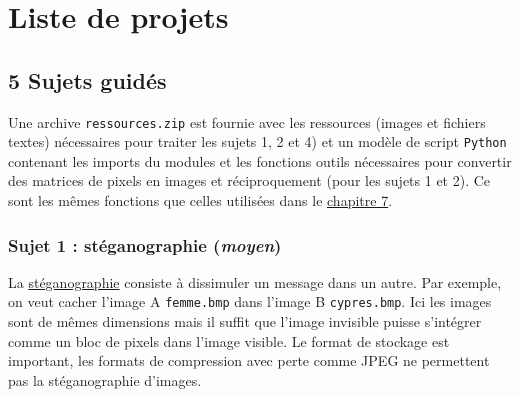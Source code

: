 \documentclass[a4paper, french, 12pt]{article}  %
\begin{document}
 


\section{Liste de projets}


\subsection{5 Sujets  guidés}


Une archive \texttt{ressources.zip} est fournie avec les ressources (images et fichiers textes) nécessaires pour traiter les sujets 1, 2 et 4)  et un  modèle de script \texttt{Python} contenant les imports du modules et les fonctions outils nécessaires pour convertir des matrices de pixels en images et réciproquement (pour les sujets 1 et 2). Ce sont les mêmes fonctions que celles utilisées dans le \href{https://parc-nsi.github.io/premiere-nsi/chapitre7.html}{chapitre 7}.


\subsubsection{Sujet 1 : stéganographie (\textit{moyen})}


La \href{https://fr.wikipedia.org/wiki/St\%C3\%A9ganographie}{stéganographie} consiste à dissimuler un message dans un autre. Par exemple, on veut cacher l'image A \texttt{femme.bmp} dans l'image B \texttt{cypres.bmp}. Ici les images sont de mêmes dimensions mais il suffit que l'image invisible puisse s'intégrer comme un bloc de pixels dans l'image visible. Le format de stockage est important, les formats de compression avec perte comme JPEG ne permettent pas la stéganographie d'images. 
\end{document}
